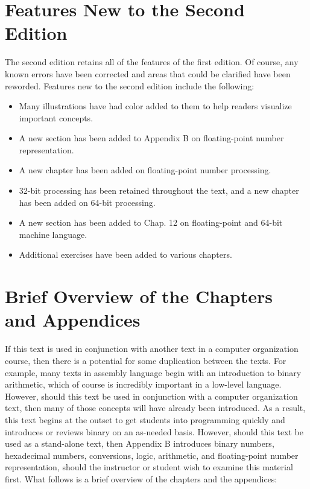 \documentclass[10pt]{book}
\begin{document}
\section{Features New to the Second Edition}
The second edition retains all of the features of the first edition. Of course, any known errors have been corrected and areas that could be clarified have been reworded. Features new to the second edition include the following:

\begin{itemize}
  \item Many illustrations have had color added to them to help readers visualize important concepts.
  \item A new section has been added to Appendix B on floating-point number representation.
  \item A new chapter has been added on floating-point number processing.
  \item 32-bit processing has been retained throughout the text, and a new chapter has been added on 64-bit processing.
  \item A new section has been added to Chap. 12 on floating-point and 64-bit machine language.
  \item Additional exercises have been added to various chapters.
\end{itemize}

\section{Brief Overview of the Chapters and Appendices}
If this text is used in conjunction with another text in a computer organization course, then there is a potential for some duplication between the texts. For example, many texts in assembly language begin with an introduction to binary arithmetic, which of course is incredibly important in a low-level language. However, should this text be used in conjunction with a computer organization text, then many of those concepts will have already been introduced. As a result, this text begins at the outset to get students into programming quickly and introduces or reviews binary on an as-needed basis. However, should this text be used as a stand-alone text, then Appendix B introduces binary numbers, hexadecimal numbers, conversions, logic, arithmetic, and floating-point number representation, should the instructor or student wish to examine this material first. What follows is a brief overview of the chapters and the appendices:
\end{document}
